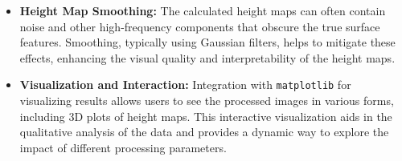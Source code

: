 \documentclass[../main.tex]{subfiles}
\begin{document}
\begin{itemize}
    \item \textbf{Height Map Smoothing:} The calculated height maps can often contain noise and other high-frequency components that obscure the true surface features. Smoothing, typically using Gaussian filters, helps to mitigate these effects, enhancing the visual quality and interpretability of the height maps.
    
    \item \textbf{Visualization and Interaction:} Integration with \texttt{matplotlib} for visualizing results allows users to see the processed images in various forms, including 3D plots of height maps. This interactive visualization aids in the qualitative analysis of the data and provides a dynamic way to explore the impact of different processing parameters.
\end{itemize}
\end{document}
